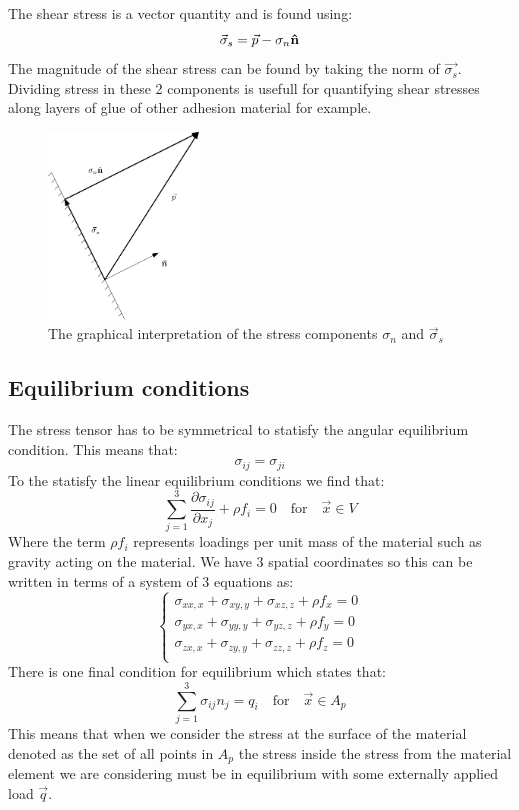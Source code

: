 \documentclass[11pt, a4paper]{article}
\DeclareRobustCommand{\uvec}[1]{{%
  \ifcat\relax\noexpand#1%
    \bm{\hat{#1}}%
  \else
    \ifcsname uvec#1\endcsname
      \csname uvec#1\endcsname
    \else
      \bm{\hat{\mathbf{#1}}}%
     \fi
   \fi
}}
\numberwithin{equation}{section}
\numberwithin{figure}{section}
\begin{document}
The shear stress is a vector quantity and is found using:
\begin{equation*}
  \vec{\sigma}_s = \vec{p} - \sigma_n \uvec{n}
\end{equation*}
The magnitude of the shear stress can be found by taking the norm of $\vec{\sigma_s}$. Dividing stress in these 2 components is usefull for quantifying shear stresses along layers of glue of other adhesion material for example.
\begin{figure}[h]
  \centerline{\includegraphics[width=40mm]{images/stress_vector.png}}
  \caption{The graphical interpretation of the stress components $\sigma_n$ and $\vec{\sigma}_s$}
\end{figure}

\subsection{Equilibrium conditions}
The stress tensor has to be symmetrical to statisfy the angular equilibrium condition. This means that:
\begin{equation}
  \sigma_{ij} = \sigma_{ji}
\end{equation}
To the statisfy the linear equilibrium conditions we find that:
\begin{equation}
  \sum_{j=1}^3 \frac{\partial \sigma_{ij}}{\partial x_j} + \rho f_i = 0 \quad \text{for} \quad \vec{x}\in V
\end{equation}
Where the term $\rho f_i$ represents loadings per unit mass of the material such as gravity acting on the material. We have 3 spatial coordinates so this can be written in terms of a system of 3 equations as:
\begin{equation}
  \begin{cases}
    \sigma_{xx,x} + \sigma_{xy,y} + \sigma_{xz,z} + \rho f_x = 0\\
    \sigma_{yx,x} + \sigma_{yy,y} + \sigma_{yz,z} + \rho f_y = 0\\
    \sigma_{zx,x} + \sigma_{zy,y} + \sigma_{zz,z} + \rho f_z = 0\\
  \end{cases}
\end{equation}
There is one final condition for equilibrium which states that:
\begin{equation}
  \sum_{j=1}^3 \sigma_{ij} n_j = q_i \quad \text{for} \quad \vec{x}\in A_p
\end{equation}
This means that when we consider the stress at the surface of the material denoted as the set of all points in $A_p$ the stress inside the stress from the material element we are considering must be in equilibrium with some externally applied load $\vec{q}$.
\end{document}
